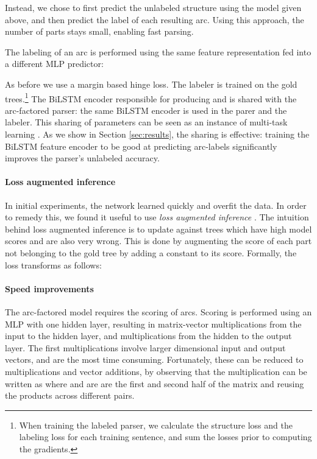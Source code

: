 \documentclass[11pt]{article}
\begin{document}
Instead, we chose to first predict the unlabeled structure using the model given
above, and then predict the label of each resulting arc.
Using this approach, the number of parts stays small, enabling fast parsing.

The labeling of an arc  is performed using the same feature
representation  fed into a different MLP predictor:

As before we use a margin based hinge loss.
The labeler is trained on the gold trees.\footnote{When training the labeled
parser, we calculate the structure loss and the labeling loss for each training
sentence, and sum the losses prior to computing the gradients.}
The \mbox{BiLSTM} encoder responsible for producing  and  is shared with the
arc-factored parser: the same \mbox{BiLSTM} encoder is used in the parer and the
labeler.  This
sharing of parameters can be seen as an instance of multi-task learning
\cite{Caruana:1997:ML:262868.262872}.
As we show in Section \ref{sec:results}, the sharing is effective: training the \mbox{BiLSTM} feature encoder to be good
at predicting arc-labels significantly improves the parser's unlabeled accuracy.

\paragraph{Loss augmented inference}
In initial experiments, the network learned quickly and overfit the data.
In order to remedy this, we found it useful to use \emph{loss augmented
inference} \cite{taskar2005learning}. The intuition behind loss augmented inference is to update against trees which
have high model scores and are also very wrong. This is done by augmenting the
score of each part not belonging to the gold tree by adding a constant to its score.
Formally, the loss transforms as follows:


\paragraph{Speed improvements}
The arc-factored model requires the scoring of  arcs. Scoring is performed
using an MLP with one hidden layer, resulting in  matrix-vector multiplications
from the input to the hidden layer, and  multiplications from the hidden to
the output layer. The first  multiplications involve larger dimensional
input and output vectors, and are the most time consuming. Fortunately, these
can be reduced to  multiplications and  vector additions,
by observing that the multiplication
 can be written as  where
 and  are are the first and second half of the matrix  and reusing
the products across different pairs.
\end{document}
